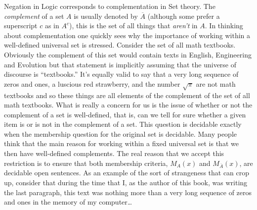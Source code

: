 \documentclass[10pt,]{book}
\theoremstyle{plain}
\theoremstyle{definition}
\theoremstyle{definition}
\numberwithin{equation}{section}
\begin{document}
    Negation in Logic corresponds to
    complementation in Set theory. The
    \emph{complement} of a set \(A\) is usually denoted by \(\overline{A}\)
    (although some prefer a superscript \(c\) \textemdash{} as in \(A^c\)), this is the set
    of all things that \emph{aren't} in \(A\). In thinking about complementation
    one quickly sees why the importance of working within a well-defined
    universal set is stressed. Consider the set of all math textbooks.
    Obviously the complement of this set would contain texts in English,
    Engineering and Evolution \textemdash{} but that statement is implicitly
    assuming that the universe of discourse is ``textbooks.'' It's equally
    valid to say that a very long sequence of zeros and ones, a luscious
    red strawberry, and the number \(\sqrt{\pi}\)
    are not math textbooks and so
    these things are all elements of the complement of the set of all math
    textbooks. What is really a concern for us is the issue of whether or not
    the complement of a set is well-defined, that is, can we tell for sure
    whether a given item is or is not in the complement of a set. This
    question is decidable exactly when the membership question for the
    original set is decidable. Many people think that the main
    reason for working within a fixed universal set is that we then
    have well-defined complements. The real reason that we accept
    this restriction is to ensure that both membership criteria,
    \(M_A(x)\) and \(M_{\overline{A}}(x)\), are decidable open sentences.
    As an example of the sort of strangeness that can crop up, consider that
    during the time that I, as the author of this book, was writing the
    last paragraph, this text was nothing more than a very long
    sequence of zeros and ones in the memory of my computer\dots{}
\par
\end{document}
